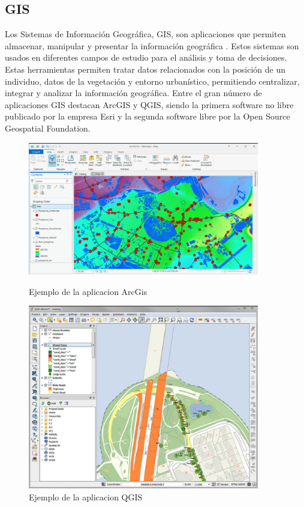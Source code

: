 \subsection{GIS} \label{section:GIS}
Los Sistemas de Información Geográfica, \ac{GIS}, son aplicaciones que permiten almacenar, manipular y 
presentar la información geográfica \cite{EPA01}. Estos sistemas son usados en diferentes campos de estudio 
para el análisis y toma de decisiones. Estas herramientas permiten tratar datos relacionados con la posición de un individuo, datos de la vegetación y entorno urbanístico, permitiendo centralizar, integrar y analizar la información geográfica. Entre el gran número de aplicaciones GIS destacan ArcGIS y QGIS, 
siendo la primera software no libre publicado por la empresa Esri y la segunda software libre por la Open 
Source Geospatial Foundation.
\begin{figure}[!htb]
\begin{minipage}{0.48\textwidth}
\centering
\includegraphics[width=0.9\textwidth]{./Imagenes/ArcGIS.png}
\caption{Ejemplo de la aplicacion ArcGis}
\label{figure:ArcGis01}
\end{minipage}\hfill
\begin{minipage}{0.48\textwidth}
\centering
\includegraphics[width=0.9\textwidth]{./Imagenes/QGIS.png}
\caption{Ejemplo de la aplicacion QGIS}
\label{figure:QGIS01}
\end{minipage}
\end{figure}

